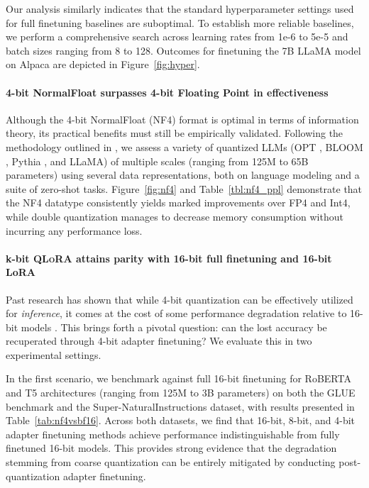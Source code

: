 Our analysis similarly indicates that the standard hyperparameter settings used for full finetuning baselines are suboptimal. To establish more reliable baselines, we perform a comprehensive search across learning rates from 1e-6 to 5e-5 and batch sizes ranging from 8 to 128. Outcomes for finetuning the 7B LLaMA model on Alpaca are depicted in Figure~\ref{fig:hyper}.

\paragraph{4-bit NormalFloat surpasses 4-bit Floating Point in effectiveness}

Although the 4-bit NormalFloat (NF4) format is optimal in terms of information theory, its practical benefits must still be empirically validated. Following the methodology outlined in \citet{dettmers2022case}, we assess a variety of quantized LLMs (OPT \citep{zhang2022opt}, BLOOM \cite{scao2022bloom}, Pythia \cite{biderman2023pythia}, and LLaMA) of multiple scales (ranging from 125M to 65B parameters) using several data representations, both on language modeling and a suite of zero-shot tasks. Figure~\ref{fig:nf4} and Table~\ref{tbl:nf4_ppl} demonstrate that the NF4 datatype consistently yields marked improvements over FP4 and Int4, while double quantization manages to decrease memory consumption without incurring any performance loss.

\paragraph{k-bit \textsc{QLoRA} attains parity with 16-bit full finetuning and 16-bit LoRA}

Past research has shown that while 4-bit quantization can be effectively utilized for \emph{inference}, it comes at the cost of some performance degradation relative to 16-bit models \citep{dettmers2022case,frantar2022gptq}. This brings forth a pivotal question: can the lost accuracy be recuperated through 4-bit adapter finetuning? We evaluate this in two experimental settings.

In the first scenario, we benchmark against full 16-bit finetuning for RoBERTA and T5 architectures (ranging from 125M to 3B parameters) on both the GLUE benchmark and the Super-NaturalInstructions dataset, with results presented in Table~\ref{tab:nf4vsbf16}. Across both datasets, we find that 16-bit, 8-bit, and 4-bit adapter finetuning methods achieve performance indistinguishable from fully finetuned 16-bit models. This provides strong evidence that the degradation stemming from coarse quantization can be entirely mitigated by conducting post-quantization adapter finetuning.

